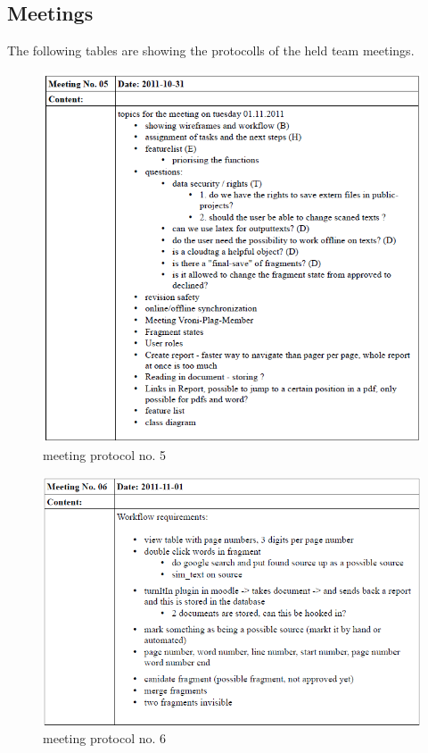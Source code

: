 \begin{appendix}

\chapter{Meetings}\label{ch:Meetings}
The following tables are showing the protocolls of the held team meetings.


\begin{figure}[htbp]
  \centering
    \includegraphics[width=\textwidth]{images/a_meetings/meeting_05.png}
  \caption{meeting protocol no. 5}
  \label{fig:meeting protocol no. 5}
\end{figure}

\begin{figure}[htbp]
  \centering
    \includegraphics[width=\textwidth]{images/a_meetings/meeting_06.png}
  \caption{meeting protocol no. 6}
  \label{fig:meeting protocol no. 6}
\end{figure}


\end{appendix}
